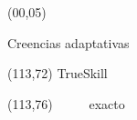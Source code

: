 \documentclass[shownotes,aspectratio=169]{beamer}
\begin{document}
\color{black!85}
\large
 


\begin{frame}
 
 \begin{textblock}{90}(00,05)
\begin{center}
 \huge  \textcolor{black!66}{Creencias adaptativas}
\end{center}

\begin{textblock}{47}(113,72)
\centering \Large  \textcolor{white!55}{TrueSkill} \ \ \ \ \ \
\end{textblock}
\begin{textblock}{47}(113,76)
\centering \Large \ \ \ \ \ \textcolor{white!55}{exacto}
\end{textblock}

\end{textblock}

{}
\end{frame}
\end{document}
